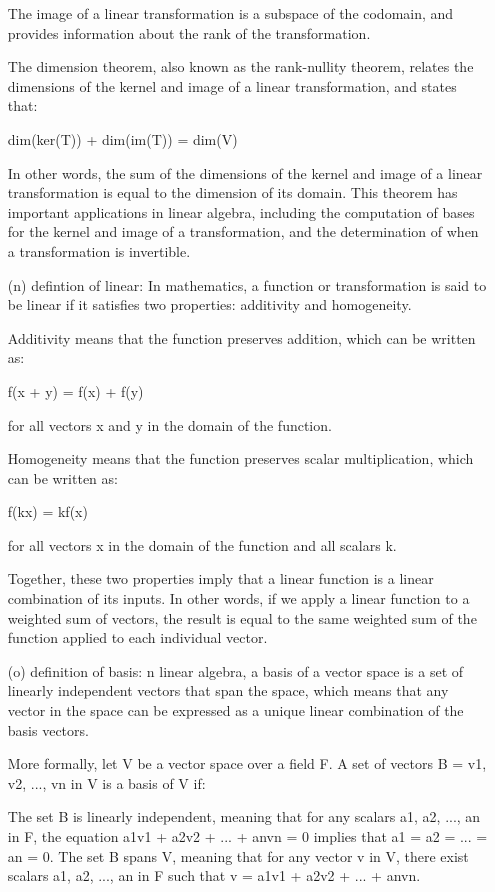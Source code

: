 \documentclass[fontsize=12pt]{scrartcl}
\begin{document}
\begin{itemize}
The image of a linear transformation is a subspace of the codomain, and provides information about the rank of the transformation.

The dimension theorem, also known as the rank-nullity theorem, relates the dimensions of the kernel and image of a linear transformation, and states that:

dim(ker(T)) + dim(im(T)) = dim(V)

In other words, the sum of the dimensions of the kernel and image of a linear transformation is equal to the dimension of its domain. This theorem has important applications in linear algebra, including the computation of bases for the kernel and image of a transformation, and the determination of when a transformation is invertible.
    \item[(n)] defintion of linear: In mathematics, a function or transformation is said to be linear if it satisfies two properties: additivity and homogeneity.

Additivity means that the function preserves addition, which can be written as:

f(x + y) = f(x) + f(y)

for all vectors x and y in the domain of the function.

Homogeneity means that the function preserves scalar multiplication, which can be written as:

f(kx) = kf(x)

for all vectors x in the domain of the function and all scalars k.

Together, these two properties imply that a linear function is a linear combination of its inputs. In other words, if we apply a linear function to a weighted sum of vectors, the result is equal to the same weighted sum of the function applied to each individual vector.
    \item[(o)] definition of basis: n linear algebra, a basis of a vector space is a set of linearly independent vectors that span the space, which means that any vector in the space can be expressed as a unique linear combination of the basis vectors.

More formally, let V be a vector space over a field F. A set of vectors B = {v1, v2, ..., vn} in V is a basis of V if:

The set B is linearly independent, meaning that for any scalars a1, a2, ..., an in F, the equation a1v1 + a2v2 + ... + anvn = 0 implies that a1 = a2 = ... = an = 0.
The set B spans V, meaning that for any vector v in V, there exist scalars a1, a2, ..., an in F such that v = a1v1 + a2v2 + ... + anvn.


\end{itemize}
\end{document}
